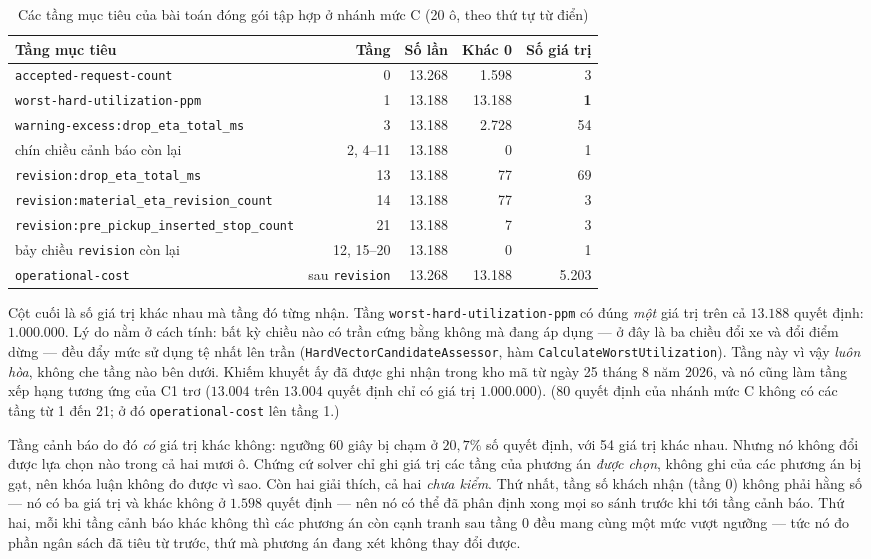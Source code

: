 \begin{table}[htbp]
\centering
\caption{Các tầng mục tiêu của bài toán đóng gói tập hợp ở nhánh mức C (20 ô, theo thứ tự từ điển)}
\label{bang:tang}
\footnotesize
\begin{tabular}{@{}lrrrr@{}}
\toprule
\textbf{Tầng mục tiêu} & \textbf{Tầng} & \textbf{Số lần} & \textbf{Khác 0} & \textbf{Số giá trị}\\
\midrule
\texttt{accepted-request-count} & 0 & 13.268 & 1.598 & 3\\
\texttt{worst-hard-utilization-ppm} & 1 & 13.188 & 13.188 & \textbf{1}\\
\texttt{warning-excess:drop\_eta\_total\_ms} & 3 & 13.188 & 2.728 & 54\\
chín chiều cảnh báo còn lại & 2, 4--11 & 13.188 & 0 & 1\\
\texttt{revision:drop\_eta\_total\_ms} & 13 & 13.188 & 77 & 69\\
\texttt{revision:material\_eta\_revision\_count} & 14 & 13.188 & 77 & 3\\
\texttt{revision:pre\_pickup\_inserted\_stop\_count} & 21 & 13.188 & 7 & 3\\
bảy chiều \texttt{revision} còn lại & 12, 15--20 & 13.188 & 0 & 1\\
\texttt{operational-cost} & sau \texttt{revision} & 13.268 & 13.188 & 5.203\\
\bottomrule
\end{tabular}
\end{table}

Cột cuối là số giá trị khác nhau mà tầng đó từng nhận. Tầng \texttt{worst-hard-utilization-ppm}
có đúng \emph{một} giá trị trên cả $13.188$ quyết định: $1.000.000$. Lý do nằm ở cách tính: bất kỳ
chiều nào có trần cứng bằng không mà đang áp dụng --- ở đây là ba chiều đổi xe và đổi điểm dừng
--- đều đẩy mức sử dụng tệ nhất lên trần (\texttt{HardVectorCandidateAssessor}, hàm
\texttt{CalculateWorstUtilization}). Tầng này vì vậy \emph{luôn hòa}, không che tầng nào bên dưới.
Khiếm khuyết ấy đã được ghi nhận trong kho mã từ ngày 25 tháng 8 năm 2026, và nó cũng làm tầng xếp
hạng tương ứng của C1 trơ ($13.004$ trên $13.004$ quyết định chỉ có giá trị $1.000.000$). ($80$
quyết định của nhánh mức C không có các tầng từ 1 đến 21; ở đó \texttt{operational-cost} lên tầng
1.)

Tầng cảnh báo do đó \emph{có} giá trị khác không: ngưỡng 60 giây bị chạm ở $20{,}7\%$ số quyết
định, với 54 giá trị khác nhau. Nhưng nó không đổi được lựa chọn nào trong cả hai mươi ô. Chứng cứ
solver chỉ ghi giá trị các tầng của phương án \emph{được chọn}, không ghi của các phương án bị gạt,
nên khóa luận không đo được vì sao. Còn hai giải thích, cả hai \emph{chưa kiểm}. Thứ nhất, tầng số
khách nhận (tầng 0) không phải hằng số --- nó có ba giá trị và khác không ở $1.598$ quyết định ---
nên nó có thể đã phân định xong mọi so sánh trước khi tới tầng cảnh báo. Thứ hai, mỗi khi tầng cảnh
báo khác không thì các phương án còn cạnh tranh sau tầng 0 đều mang cùng một mức vượt ngưỡng --- tức
nó đo phần ngân sách đã tiêu từ trước, thứ mà phương án đang xét không thay đổi được.

